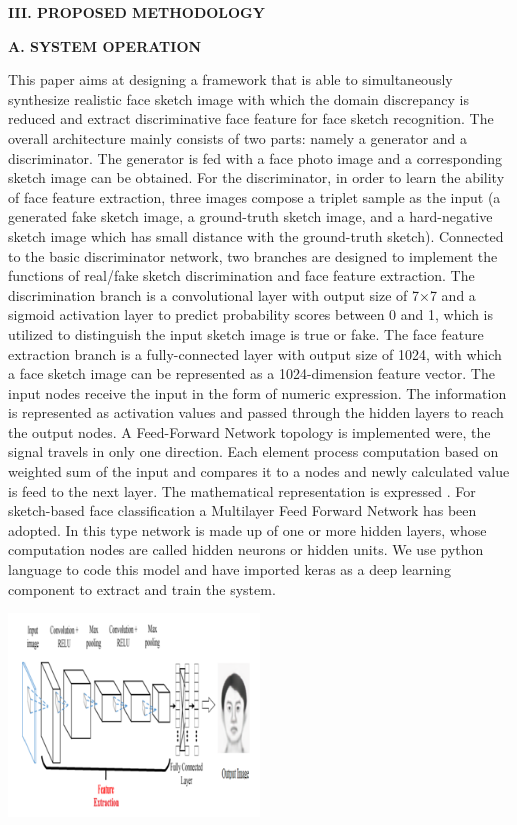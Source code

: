 \documentclass[journal]{IEEEtran} %
\begin{document}
\textbf{III. PROPOSED METHODOLOGY}

\textbf{A. SYSTEM OPERATION}

This paper aims at designing a framework that is able to simultaneously synthesize realistic face sketch image with which the domain discrepancy is reduced and extract discriminative face feature for face sketch recognition. The overall architecture mainly consists of two parts: namely a generator and a discriminator. The generator is fed with a face photo image and a corresponding sketch image can be obtained. For the discriminator, in order to learn the ability of face feature extraction, three images compose a triplet sample as the input (a generated fake sketch image, a ground-truth sketch image, and a hard-negative sketch image which has small distance with the ground-truth sketch).
Connected to the basic discriminator network, two branches are designed to implement the functions of real/fake sketch discrimination and face feature extraction. The discrimination branch is a convolutional layer with output size of 7×7 and a sigmoid activation layer to predict probability scores between 0 and 1, which is utilized to distinguish the input sketch image is true or fake. The face feature extraction branch is a fully-connected layer with output size of 1024, with which a face sketch image can be represented as a 1024-dimension feature vector.
The input nodes receive the input in the form of numeric expression. The information is represented as activation values and passed through the hidden layers to reach the output nodes. A Feed-Forward Network topology is implemented were, the signal travels in only one direction. Each element process computation based on weighted sum of the input and compares it to a nodes and newly calculated value is feed to the next layer. The mathematical representation is expressed . For sketch-based face classification a Multilayer Feed Forward Network has been adopted. In this type network is made up of one or more hidden layers, whose computation nodes are called hidden neurons or hidden units. We use python language to code this model and have imported keras as a deep learning component to extract and train the system.

 



\includegraphics[width=0.5\textwidth]{Face_sketch.png}
\end{document}
